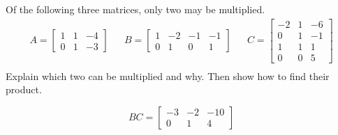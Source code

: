 
\begin{exerciseStatement}


Of the following three matrices, only two may be multiplied. 
\begin{align*} A= \left[\begin{array}{ccc}
1 & 1 & -4 \\
0 & 1 & -3
\end{array}\right]  & & B= \left[\begin{array}{cccc}
1 & -2 & -1 & -1 \\
0 & 1 & 0 & 1
\end{array}\right]  & & C= \left[\begin{array}{ccc}
-2 & 1 & -6 \\
0 & 1 & -1 \\
1 & 1 & 1 \\
0 & 0 & 5
\end{array}\right]  \\ \end{align*}
             Explain which two can be multiplied and why. Then show how to find their product.


\end{exerciseStatement}
    
\begin{exerciseAnswer} 
\[BC= \left[\begin{array}{ccc}
-3 & -2 & -10 \\
0 & 1 & 4
\end{array}\right] \]
\end{exerciseAnswer}
    
